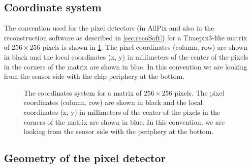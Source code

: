 \subsection{Coordinate system}

The convention used for the pixel detectors (in AllPix and also in the
reconstruction software as described in \cref{sec:recoSoft}) for a
Timepix3-like matrix of $256\times256$ pixels is shown in
\cref{fig:coordinateSystem}. The pixel coordinates (column, row) are
shown in black and the local coordinates (x, y) in millimeters of the
center of the pixels in the corners of the matrix are shown in
blue. In this convention we are looking from the sensor side with the
chip periphery at the bottom.

\begin{figure}[htbp]
  \centering
  \caption{The coordinates system for a matrix of $256\times256$
    pixels. The pixel coordinates (column, row) are shown in black and
    the local coordinates (x, y) in millimeters of the center of the
    pixels in the corners of the matrix are shown in blue. In this
    convention, we are looking from the sensor side with the periphery
    at the bottom.}
  \label{fig:coordinateSystem}
\end{figure}
\subsection{Geometry of the pixel detector}

